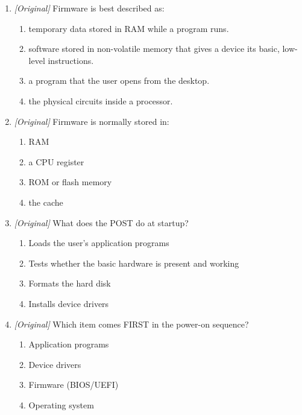 \begin{enumerate}[label=\textbf{Q\arabic*.}, leftmargin=*]
  the hardware and loads the operating system when a computer is switched on?
  \begin{enumerate}[label=\Alph*.]
    \item Device driver
    \item BIOS
    \item Application program
    \item Compiler
  \end{enumerate}
\item \textit{[Original]} Firmware is best described as:
  \begin{enumerate}[label=\Alph*.]
    \item temporary data stored in RAM while a program runs.
    \item software stored in non-volatile memory that gives a device its
      basic, low-level instructions.
    \item a program that the user opens from the desktop.
    \item the physical circuits inside a processor.
  \end{enumerate}
\item \textit{[Original]} Firmware is normally stored in:
  \begin{enumerate}[label=\Alph*.]
    \item RAM
    \item a CPU register
    \item ROM or flash memory
    \item the cache
  \end{enumerate}
\item \textit{[Original]} What does the POST do at startup?
  \begin{enumerate}[label=\Alph*.]
    \item Loads the user's application programs
    \item Tests whether the basic hardware is present and working
    \item Formats the hard disk
    \item Installs device drivers
  \end{enumerate}
\item \textit{[Original]} Which item comes FIRST in the power-on sequence?
  \begin{enumerate}[label=\Alph*.]
    \item Application programs
    \item Device drivers
    \item Firmware (BIOS/UEFI)
    \item Operating system

\end{enumerate}
\end{enumerate}
